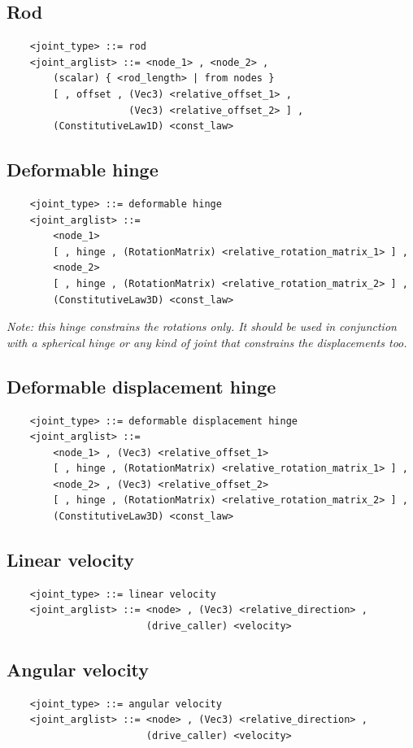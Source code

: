 \documentclass[10pt,dvips]{report}
\begin{document}
\subsection{Rod}
\begin{verbatim}
    <joint_type> ::= rod 
    <joint_arglist> ::= <node_1> , <node_2> , 
        (scalar) { <rod_length> | from nodes }
        [ , offset , (Vec3) <relative_offset_1> , 
                     (Vec3) <relative_offset_2> ] ,
        (ConstitutiveLaw1D) <const_law>
\end{verbatim}

\subsection{Deformable hinge}
\begin{verbatim}
    <joint_type> ::= deformable hinge
    <joint_arglist> ::= 
        <node_1>
        [ , hinge , (RotationMatrix) <relative_rotation_matrix_1> ] ,
        <node_2> 
        [ , hinge , (RotationMatrix) <relative_rotation_matrix_2> ] ,
        (ConstitutiveLaw3D) <const_law>
\end{verbatim}
{\em 
    Note: this hinge constrains the rotations only.
    It should be used in conjunction with a spherical hinge or any kind of
    joint that constrains the displacements too.
}

\subsection{Deformable displacement hinge}
\begin{verbatim}
    <joint_type> ::= deformable displacement hinge
    <joint_arglist> ::= 
        <node_1> , (Vec3) <relative_offset_1>
        [ , hinge , (RotationMatrix) <relative_rotation_matrix_1> ] ,
        <node_2> , (Vec3) <relative_offset_2>
        [ , hinge , (RotationMatrix) <relative_rotation_matrix_2> ] ,
        (ConstitutiveLaw3D) <const_law>
\end{verbatim}

\subsection{Linear velocity}
\begin{verbatim}
    <joint_type> ::= linear velocity
    <joint_arglist> ::= <node> , (Vec3) <relative_direction> , 
                        (drive_caller) <velocity>
\end{verbatim}

\subsection{Angular velocity}
\begin{verbatim}
    <joint_type> ::= angular velocity
    <joint_arglist> ::= <node> , (Vec3) <relative_direction> , 
                        (drive_caller) <velocity>
\end{verbatim}
\end{document}
